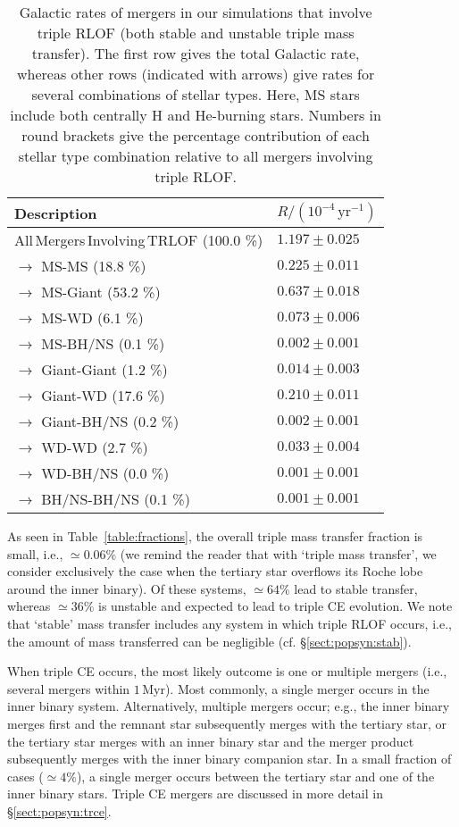 \documentclass[twocolumn,appendixfloats,tighten]{aastex631}
\newcommand{\myr}{\mathrm{Myr}}
\newcommand{\yr}{\mathrm{yr}}
\begin{document}
\begin{table}
\begin{tabular}{ll}
\toprule 
Description & $R/(10^{-4} \, \yr^{-1})$ \\
\midrule
All\,Mergers\,Involving\,TRLOF (100.0 \%) & $1.197 \pm 0.025$ \\
$\rightarrow$ MS-MS (18.8 \%) & $0.225 \pm 0.011$ \\
$\rightarrow$ MS-Giant (53.2 \%) & $0.637 \pm 0.018$ \\
$\rightarrow$ MS-WD (6.1 \%) & $0.073 \pm 0.006$ \\
$\rightarrow$ MS-BH/NS (0.1 \%) & $0.002 \pm 0.001$ \\
$\rightarrow$ Giant-Giant (1.2 \%) & $0.014 \pm 0.003$ \\
$\rightarrow$ Giant-WD (17.6 \%) & $0.210 \pm 0.011$ \\
$\rightarrow$ Giant-BH/NS (0.2 \%) & $0.002 \pm 0.001$ \\
$\rightarrow$ WD-WD (2.7 \%) & $0.033 \pm 0.004$ \\
$\rightarrow$ WD-BH/NS (0.0 \%) & $0.001 \pm 0.001$ \\
$\rightarrow$ BH/NS-BH/NS (0.1 \%) & $0.001 \pm 0.001$ \\
\bottomrule
\end{tabular}
\caption{Galactic rates of mergers in our simulations that involve triple RLOF (both stable and unstable triple mass transfer). The first row gives the total Galactic rate, whereas other rows (indicated with arrows) give rates for several combinations of stellar types. Here, MS stars include both centrally H and He-burning stars. Numbers in round brackets give the percentage contribution of each stellar type combination relative to all mergers involving triple RLOF.}
\label{table:rates}
\end{table}

As seen in Table~\ref{table:fractions}, the overall triple mass transfer fraction is small, i.e., $\simeq 0.06\%$ (we remind the reader that with `triple mass transfer', we consider exclusively the case when the tertiary star overflows its Roche lobe around the inner binary). Of these systems, $\simeq 64\%$ lead to stable transfer, whereas $\simeq 36\%$ is unstable and expected to lead to triple CE evolution. We note that `stable' mass transfer includes any system in which triple RLOF occurs, i.e., the amount of mass transferred can be negligible (cf. \S\ref{sect:popsyn:stab}). 

When triple CE occurs, the most likely outcome is one or multiple mergers (i.e., several mergers within $1\,\myr$). Most commonly, a single merger occurs in the inner binary system. Alternatively, multiple mergers occur; e.g., the inner binary merges first and the remnant star subsequently merges with the tertiary star, or the tertiary star merges with an inner binary star and the merger product subsequently merges with the inner binary companion star. In a small fraction of cases ($\simeq 4\%$), a single merger occurs between the tertiary star and one of the inner binary stars. Triple CE mergers are discussed in more detail in \S\ref{sect:popsyn:trce}. 
\end{document}
